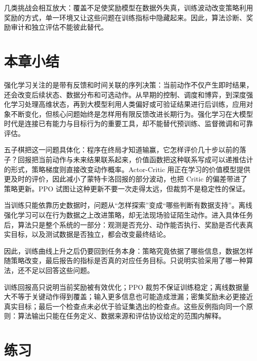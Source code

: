 几类挑战会相互放大：覆盖不足使奖励模型在数据外失真，训练波动改变策略利用奖励的方式，单一环境又让这些问题在训练指标中隐藏起来。因此，算法诊断、奖励审计和独立评估不能彼此替代。

\section{本章小结}

强化学习关注的是带有反馈和时间关联的序列决策：当前动作不仅产生即时结果，还会改变后续状态、数据分布和可选动作。从早期的控制、调度和博弈，到深度强化学习处理高维状态，再到大模型利用人类偏好或可验证结果进行后训练，应用对象不断变化，但核心问题始终是怎样用有限反馈改进长期行为。强化学习在大模型时代是连接已有能力与目标行为的重要工具，却不能替代预训练、监督微调和可靠评估。

五子棋把这一问题具体化：程序在终局才知道输赢，它怎样评价几十步以前的落子？回报把当前动作与未来结果联系起来，价值函数把这种联系写成可以递推估计的形式，策略梯度则直接改变动作概率。Actor-Critic 用正在学习的价值模型提供更及时的评价，因此减小了蒙特卡洛回报的部分波动，也把 Critic 的偏差带进了策略更新。PPO 试图让这种更新不要一次走得太远，但裁剪不是稳定性的保证。

当训练只能依靠历史数据时，问题从“怎样探索”变成“哪些判断有数据支持”。离线强化学习可以在行为数据之上改进策略，却无法现场验证陌生动作。进入具体任务后，算法只是整个系统的一部分：观测是否充分、动作能否执行、奖励是否代表真实目标，以及测试数据是否独立，都会改变最终结论。

因此，训练曲线上升之后仍要回到任务本身：策略究竟依据了哪些信息，数据怎样随策略改变，最后报告的指标是否真的对应任务目标。只说明实验采用了哪一种算法，还不足以回答这些问题。

训练回报高只说明当前奖励被有效优化；PPO 裁剪不保证训练稳定；离线数据量大不等于关键动作得到覆盖；输入更多信息也可能造成泄漏；密集奖励未必更接近真实目标；最后一个检查点未必优于验证集选出的检查点。这些反例指向同一个原则：算法输出只能在任务定义、数据来源和评估协议给定的范围内解释。

\section*{练习}

